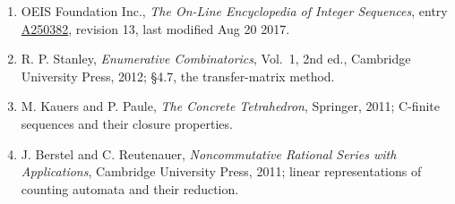 \documentclass[11pt]{article}
\theoremstyle{definition}
\begin{document}
\begin{enumerate}

\item OEIS Foundation Inc., \emph{The On-Line Encyclopedia of Integer Sequences}, entry \href{https://oeis.org/A250382}{A250382}, revision 13, last modified Aug 20 2017.

\item R. P. Stanley, \emph{Enumerative Combinatorics}, Vol.~1, 2nd ed., Cambridge University Press, 2012; \S4.7, the transfer-matrix method.

\item M. Kauers and P. Paule, \emph{The Concrete Tetrahedron}, Springer, 2011; C-finite sequences and their closure properties.

\item J. Berstel and C. Reutenauer, \emph{Noncommutative Rational Series with Applications}, Cambridge University Press, 2011; linear representations of counting automata and their reduction.

\end{enumerate}
\end{document}
